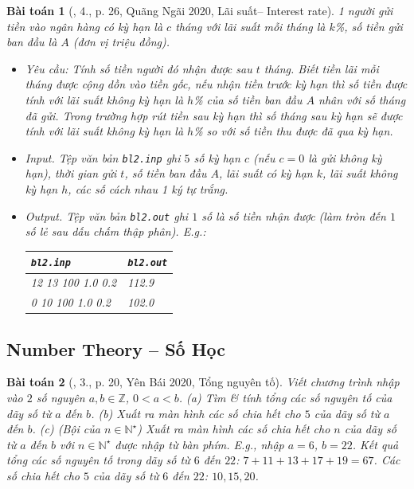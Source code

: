 \documentclass{article}
\newtheorem{baitoan}{Bài toán}
\begin{document}
\begin{baitoan}[\cite{VietSTEM2021}, 4., p. 26, Quãng Ngãi 2020, Lãi suất-- Interest rate]
	1 người gửi tiền vào ngân hàng có kỳ hạn là $c$ tháng với lãi suất mỗi tháng là $k$\emph{\%}, số tiền gửi ban đầu là $A$ (đơn vị triệu đồng). 
	\begin{itemize}
		\item {\sf Yêu cầu:} Tính số tiền người đó nhận được sau $t$ tháng. Biết tiền lãi mỗi tháng được cộng dồn vào tiền gốc, nếu nhận tiền trước kỳ hạn thì số tiền được tính với lãi suất không kỳ hạn là $h$\emph{\%} của số tiền ban đầu $A$ nhân với số tháng đã gửi. Trong trường hợp rút tiền sau kỳ hạn thì số tháng sau kỳ hạn sẽ được tính với lãi suất không kỳ hạn là $h$\emph{\%} so với số tiền thu được đã qua kỳ hạn.
		\item {\sf Input.} Tệp văn bản \verb|bl2.inp| ghi $5$ số kỳ hạn $c$ (nếu $c = 0$ là gửi không kỳ hạn), thời gian gửi $t$, số tiền ban đầu $A$, lãi suất có kỳ hạn $k$, lãi suất không kỳ hạn $h$, các số cách nhau 1 ký tự trắng.
		\item {\sf Output.} Tệp văn bản \verb|bl2.out| ghi $1$ số là số tiền nhận được (làm tròn đến $1$ số lẻ sau dấu chấm thập phân). E.g.:
		\begin{table}[H]
			\centering
			\begin{tabular}{|l|l|}
				\hline
				{\tt bl2.inp} & {\tt bl2.out} \\
				\hline
				12 13 100 1.0 0.2 & 112.9 \\
				\hline
				0 10 100 1.0 0.2 & 102.0 \\
				\hline
			\end{tabular}
		\end{table}
	\end{itemize}
\end{baitoan}


\subsection{Number Theory -- Số Học}

\begin{baitoan}[\cite{VietSTEM2021}, 3., p. 20, Yên Bái 2020, Tổng nguyên tố]
	Viết chương trình nhập vào $2$ số nguyên $a,b\in\mathbb{Z}$, $0 < a < b$. (a) Tìm \& tính tổng các số nguyên tố của dãy số từ $a$ đến $b$. (b) Xuất ra màn hình các số chia hết cho $5$ của dãy số từ $a$ đến $b$. (c) \emph{(Bội của $n\in\mathbb{N}^\star$)} Xuất ra màn hình các số chia hết cho $n$ của dãy số từ $a$ đến $b$ với $n\in\mathbb{N}^\star$ được nhập từ bàn phím. E.g., nhập $a = 6$, $b = 22$. Kết quả tổng các số nguyên tố trong dãy số từ $6$ đến $22$: $7 + 11 + 13 + 17 + 19 = 67$. Các số chia hết cho $5$ của dãy số từ $6$ đến $22$: $10,15,20$.
\end{baitoan}
\end{document}
